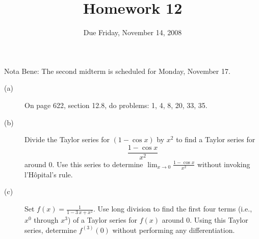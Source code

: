 \documentclass[12pt]{article}
\title{Homework 12}
\date{Due Friday, November 14, 2008}
\begin{document}
\maketitle

\begin{center}
{\sc Nota Bene:} The second midterm is scheduled for Monday, November 17.
\end{center}

\vfil

\begin{description}

\item[(a)] On page 622, section 12.8, do problems: 1, 4, 8, 20, 33, 35.

\vfill

\item[(b)] Divide the Taylor series for $(1 - \cos x)$ by $x^2$ to find
  a Taylor series for
$$
\frac{1 - \cos x}{x^2}
$$
around $0$.  Use this series to determine $\displaystyle\lim_{x \to 0}
\displaystyle\frac{1 - \cos x}{x^2}$ without invoking
l'H\^opital's rule.

\vfill

\item[(c)] Set $f(x) = \displaystyle\frac{1}{1 - 3\,x + x^2}$.  Use
  long division to find the first four terms (i.e., $x^0$ through
  $x^3$) of a Taylor series for $f(x)$ around $0$.  Using this Taylor
  series, determine $f^{(3)}(0)$ without performing any
  differentiation.

\vfill

\end{description}
\end{document}
